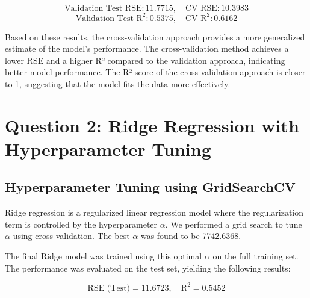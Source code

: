 \documentclass[a4paper,12pt]{article}
\begin{document}
\[
\text{Validation Test RSE}: 11.7715, \quad \text{CV RSE}: 10.3983
\]
\[
\text{Validation Test R}^2: 0.5375, \quad \text{CV R}^2: 0.6162
\]

Based on these results, the cross-validation approach provides a more generalized estimate of the model's performance. The cross-validation method achieves a lower RSE and a higher R² compared to the validation approach, indicating better model performance. The R² score of the cross-validation approach is closer to 1, suggesting that the model fits the data more effectively. 

\section*{Question 2: Ridge Regression with Hyperparameter Tuning}

\subsection*{Hyperparameter Tuning using GridSearchCV}
Ridge regression is a regularized linear regression model where the regularization term is controlled by the hyperparameter \(\alpha\). We performed a grid search to tune \(\alpha\) using cross-validation. The best \(\alpha\) was found to be 7742.6368.

The final Ridge model was trained using this optimal \(\alpha\) on the full training set. The performance was evaluated on the test set, yielding the following results:

\[
\text{RSE (Test)} = 11.6723, \quad \text{R}^2 = 0.5452
\]
\end{document}
